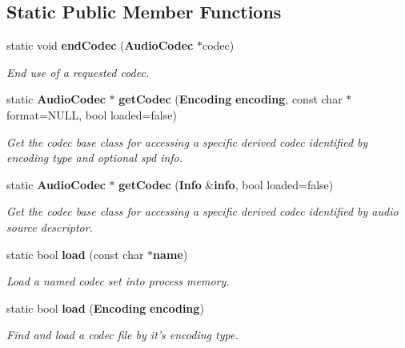 \subsection*{Static Public Member Functions}
\begin{DoxyCompactItemize}
\item 
static void {\bf endCodec} ({\bf AudioCodec} $\ast$codec)
\begin{DoxyCompactList}\small\item\em End use of a requested codec. \item\end{DoxyCompactList}\item 
static {\bf AudioCodec} $\ast$ {\bf getCodec} ({\bf Encoding} {\bf encoding}, const char $\ast$format=NULL, bool loaded=false)
\begin{DoxyCompactList}\small\item\em Get the codec base class for accessing a specific derived codec identified by encoding type and optional spd info. \item\end{DoxyCompactList}\item 
static {\bf AudioCodec} $\ast$ {\bf getCodec} ({\bf Info} \&{\bf info}, bool loaded=false)
\begin{DoxyCompactList}\small\item\em Get the codec base class for accessing a specific derived codec identified by audio source descriptor. \item\end{DoxyCompactList}\item 
static bool {\bf load} (const char $\ast${\bf name})
\begin{DoxyCompactList}\small\item\em Load a named codec set into process memory. \item\end{DoxyCompactList}\item 
static bool {\bf load} ({\bf Encoding} {\bf encoding})
\begin{DoxyCompactList}\small\item\em Find and load a codec file by it's encoding type. \item\end{DoxyCompactList}\end{DoxyCompactItemize}
